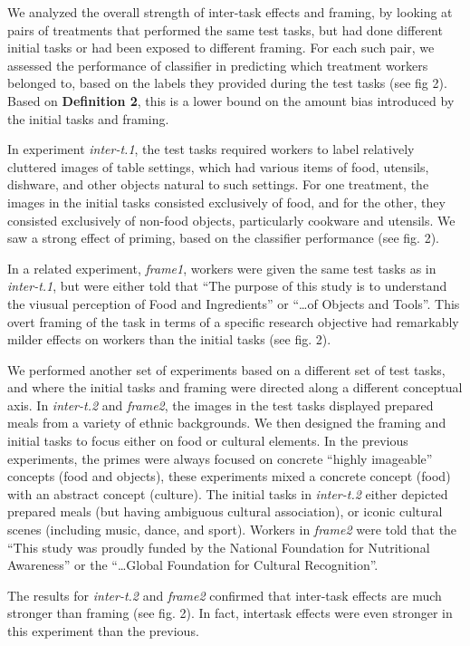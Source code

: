 \documentclass[12pt]{article}
\begin{document}
We analyzed the overall strength of inter-task effects and framing, by looking
at pairs of treatments that performed the same test tasks, but had done
different initial tasks or had been exposed to different framing.
For each such pair, we assessed the performance of classifier
in predicting which treatment workers belonged to, based on the labels they
provided during the test tasks (see fig 2).  
Based on \textbf{Definition 2}, this is a lower bound on the amount 
bias introduced by the initial tasks and framing.

In experiment \textit{inter-t.1}, the test tasks required workers to
label relatively cluttered images of table settings, which had various items
of food, utensils, dishware, and other objects natural to such settings.
For one treatment, the images in the initial tasks consisted exclusively of 
food, and for the other, they consisted exclusively of non-food objects, 
particularly cookware and utensils.  We saw a strong effect of priming, 
based on the classifier performance (see fig. 2). 

In a related experiment, \textit{frame1}, workers were given the same test tasks
as in \textit{inter-t.1}, but were either told 
that ``The purpose of this study is to understand the viusual perception of
Food and Ingredients'' or ``\ldots of Objects and Tools''.  This overt framing
of the task in terms of a specific research objective had remarkably milder
effects on workers than the initial tasks (see fig. 2).

We performed another set of experiments based on a different set of test 
tasks, and where the initial tasks and framing were directed along a different
conceptual axis.  In \textit{inter-t.2} and \textit{frame2}, the images in the test 
tasks displayed prepared meals from a variety of ethnic backgrounds.  We then
designed the framing and initial tasks to focus either on food or cultural 
elements.  In the previous experiments, the primes were always focused on 
concrete ``highly imageable'' concepts (food and objects), these experiments
mixed a concrete concept (food) with an abstract concept (culture).
The initial tasks in \textit{inter-t.2} either depicted prepared meals (but having
ambiguous cultural association), or iconic cultural scenes (including music, 
dance, and sport).  Workers in \textit{frame2} were told that the ``This study
was proudly funded by the National Foundation for Nutritional Awareness'' 
or the ``\ldots Global Foundation for Cultural Recognition''.

The results for \textit{inter-t.2} and \textit{frame2} confirmed that 
inter-task effects are much stronger than framing (see fig. 2).  In fact, 
intertask effects were even stronger in this experiment than the previous.
\end{document}

